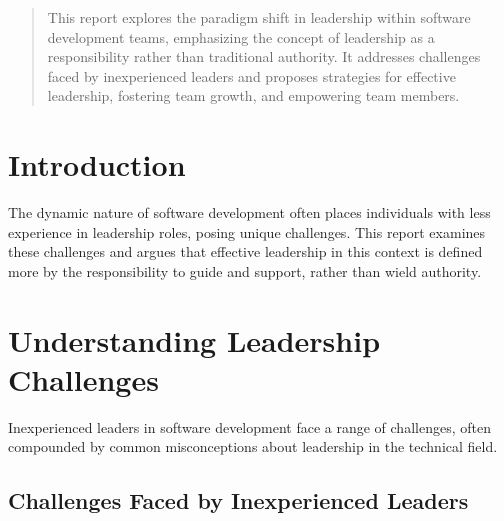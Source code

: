 \documentclass[runningheads]{llncs}
\begin{document}
\newpage

\begin{abstract}
This report explores the paradigm shift in leadership within software development teams, emphasizing the concept of leadership as a responsibility rather than traditional authority. It addresses challenges faced by inexperienced leaders and proposes strategies for effective leadership, fostering team growth, and empowering team members.


\end{abstract}
%
%
%



\section{Introduction}
The dynamic nature of software development often places individuals with less experience in leadership roles, posing unique challenges. This report examines these challenges and argues that effective leadership in this context is defined more by the responsibility to guide and support, rather than wield authority.

\section{Understanding Leadership Challenges}

 Inexperienced leaders in software development face a range of challenges, often compounded by common misconceptions about leadership in the technical field.

\subsection{Challenges Faced by Inexperienced Leaders}
\end{document}
